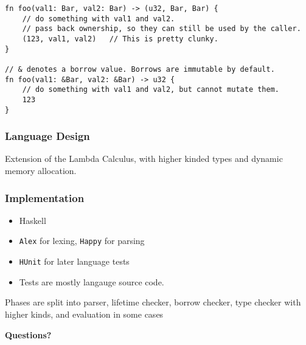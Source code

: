 \documentclass[xcolor=dvipsnames, aspectratio=169]{beamer}
\begin{document}
\begin{frame}[fragile]
    \begin{lstlisting}[basicstyle=\footnotesize\ttfamily]
fn foo(val1: Bar, val2: Bar) -> (u32, Bar, Bar) {
    // do something with val1 and val2.
    // pass back ownership, so they can still be used by the caller.
    (123, val1, val2)   // This is pretty clunky.
}

// & denotes a borrow value. Borrows are immutable by default.
fn foo(val1: &Bar, val2: &Bar) -> u32 {
    // do something with val1 and val2, but cannot mutate them.
    123
}
    \end{lstlisting}
\end{frame}

\begin{frame}[fragile]
    \frametitle{Language Design}
    Extension of the Lambda Calculus, with higher kinded types and dynamic
    memory allocation.
\end{frame}

\begin{frame}[fragile]
    \frametitle{Implementation}
    \begin{itemize}
        \item Haskell
        \item \texttt{Alex} for lexing, \texttt{Happy} for parsing
        \item \texttt{HUnit} for later language tests
        \item Tests are mostly langauge source code.
    \end{itemize}
    Phases are split into parser, lifetime checker, borrow checker, 
    type checker with higher kinds, and evaluation in some cases
\end{frame}

\begin{frame}
    \textbf{Questions?}
\end{frame}
\end{document}

